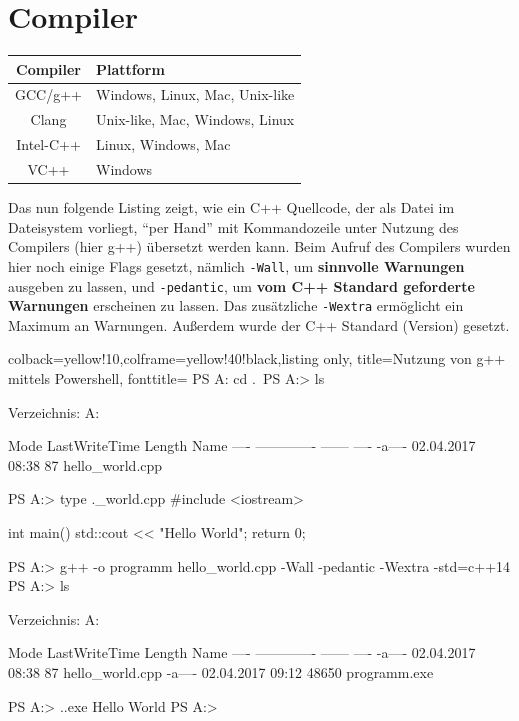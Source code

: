 \documentclass[a4paper]{report}
\begin{document}
\section{Compiler}
\begin{center}
\begin{tabular}{|c|l|}
	\hline
	\textbf{Compiler} & \textbf{Plattform} \\ \hline \hline
	GCC/g++ & Windows, Linux, Mac, Unix-like \\ \hline
	Clang & Unix-like, Mac, Windows, Linux \\ \hline
	Intel-C++ & Linux, Windows, Mac \\ \hline
	VC++ & Windows \\ \hline
\end{tabular}
\end{center}
Das nun folgende Listing zeigt, wie ein C++ Quellcode, der als Datei im Dateisystem vorliegt, "`per Hand"' mit Kommandozeile unter Nutzung des Compilers (hier g++) übersetzt werden kann. Beim Aufruf des Compilers wurden hier noch einige Flags gesetzt, nämlich \texttt{-Wall}, um \textbf{sinnvolle Warnungen} ausgeben zu lassen, und \texttt{-pedantic}, um \textbf{vom C++ Standard geforderte Warnungen} erscheinen zu lassen. Das zusätzliche \texttt{-Wextra} ermöglicht ein Maximum an Warnungen. Außerdem wurde der C++ Standard (Version) gesetzt.
\begin{center}
\begin{tcblisting}{colback=yellow!10,colframe=yellow!40!black,listing only,
		title=Nutzung von g++ mittels Powershell, fonttitle=\bfseries}
PS A:\> cd .\example\
PS A:\example> ls


Verzeichnis: A:\example


Mode                LastWriteTime         Length Name
----                -------------         ------ ----
-a----       02.04.2017     08:38             87 hello_world.cpp


PS A:\example> type .\hello_world.cpp
#include <iostream>

int main(){
	std::cout << "Hello World";
	return 0;
}

PS A:\example> g++ -o programm hello_world.cpp -Wall -pedantic -Wextra -std=c++14
PS A:\example> ls


Verzeichnis: A:\example


Mode                LastWriteTime         Length Name
----                -------------         ------ ----
-a----       02.04.2017     08:38             87 hello_world.cpp
-a----       02.04.2017     09:12          48650 programm.exe


PS A:\example> .\programm.exe
Hello World
PS A:\example>
\end{tcblisting}
\end{center}
\end{document}
